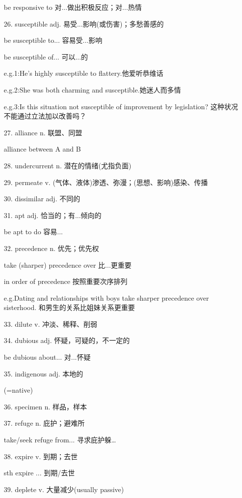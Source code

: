 \begin{multicols}{2}
\begin{itemize}
        be responsive to 对...做出积极反应；对...热情
        \item [26.]susceptible adj. 易受...影响(或伤害)；多愁善感的
        
        be susceptible to... 容易受...影响
        

        be susceptible of... 可以...的


        e.g.1:He's highly susceptible to flattery.他爱听恭维话


        e.g.2:She was both charming and susceptible.她迷人而多情


        e.g.3:Is this situation not susceptible of improvement by legislation?
        这种状况不能通过立法加以改善吗？
        \item [27.]alliance n. 联盟、同盟
        

        alliance between A and B
        \item [28.]undercurrent n. 潜在的情绪(尤指负面)
        \item [29.]permeate v. (气体、液体)渗透、弥漫；(思想、影响)感染、传播
        \item [30.]dissimilar adj. 不同的
        \item [31.]apt adj. 恰当的；有...倾向的
        

        be apt to do 容易...
        \item [32.]precedence n. 优先；优先权
        

        take (sharper) precedence over 比...更重要


        in order of precedence 按照重要次序排列


        e.g.Dating and relationships with boys take sharper precedence over sisterhood.
        和男生的关系比姐妹关系更重要
        \item [33.]dilute v. 冲淡、稀释、削弱
        \item [34.]dubious adj. 怀疑，可疑的，不一定的
        
        be dubious about... 对...怀疑
        \item [35.]indigenous adj. 本地的
        
        (=native)
        \item [36.]specimen n. 样品，样本
        \item [37.]refuge n. 庇护；避难所
        
        take/seek refuge from... 寻求庇护躲\dots
        \item [38.]expire v. 到期；去世
        
        sth expire ... 到期/去世
        \item [39.]deplete v. 大量减少(usually passive)
        

\end{itemize}
\end{multicols}
